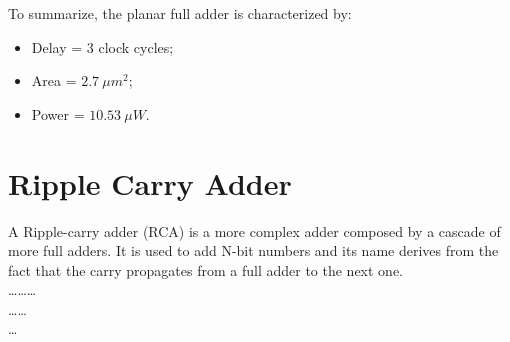   



To summarize, the planar full adder is characterized by:
\begin{itemize}
\item Delay = 3 clock cycles;
\item Area = $2.7\ \mu m^2$;
\item Power = $10.53\ \mu W$.
\end{itemize}
	
\section{Ripple Carry Adder}

A Ripple-carry adder (RCA) is a more complex adder composed by a cascade of more full adders. It is used to add N-bit numbers and its name derives from the fact that the carry propagates from a full adder to the next one.\\
\dots \dots \dots \\
\dots \dots \\
\dots